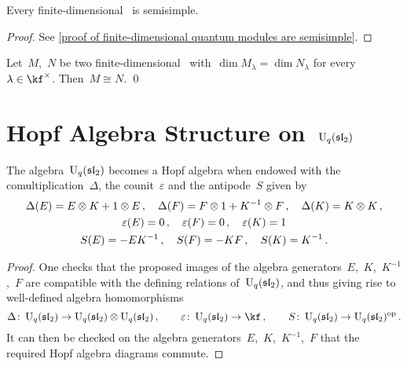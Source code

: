 \documentclass[a4paper, 11pt, oneside]{scrartcl}
\begin{document}
\begin{theorem}
  \label{finite-dimensional quantum modules are semisimple}
  Every finite-dimensional~ is semisimple.
\end{theorem}

\begin{proof}[Proof]
  See \cref{proof of finite-dimensional quantum modules are semisimple}.
\end{proof}
  
\begin{corollary}
  \label{decomposition from quantum weight spaces}
  Let~$M$,~$N$ be two finite-dimensional~ with~$\dim M_\lambda = \dim N_\lambda$ for every~$\lambda \in \kf^\times$.
  Then~$M \cong N$.
  \qed
\end{corollary}





\section{Hopf Algebra Structure on~\texorpdfstring{$\operatorname{U}_q(\mathfrak{sl}_2)$}{Uq(sl2)}}


\begin{proposition}
  \label{hopf algebra structure on quantum sl2}
  The algebra~$\operatorname{U}_q(\mathfrak{sl}_2)$ becomes a Hopf algebra when endowed with the comultiplication~$\Delta$, the counit~$\varepsilon$ and the antipode~$S$ given by
  \begin{gather*}
    \Delta(E) = E \otimes K + 1 \otimes E \,,
    \quad
    \Delta(F) = F \otimes 1 + K^{-1} \otimes F \,,
    \quad
    \Delta(K) = K \otimes K \,,
    \\
    \varepsilon(E) = 0 \,,
    \quad
    \varepsilon(F) = 0 \,,
    \quad
    \varepsilon(K) = 1
    \\
    S(E) = -E K^{-1} \,,
    \quad
    S(F) = -KF \,,
    \quad
    S(K) = K^{-1} \,.
  \end{gather*}
\end{proposition}

\begin{proof}
  One checks that the proposed images of the algebra generators~$E$,~$K$,~$K^{-1}$,~$F$ are compatible with the defining relations of~$\operatorname{U}_q(\mathfrak{sl}_2)$, and thus giving rise to well-defined algebra homomorphisms
  \[
    \Delta \colon \Univ_q(\sllie_2) \to \Univ_q(\sllie_2) \tensor \Univ_q(\sllie_2) \,,
    \qquad
    \varepsilon \colon \Univ_q(\sllie_2) \to \kf \,,
    \qquad
    S \colon \Univ_q(\sllie_2) \to \Univ_q(\sllie_2)^{\op} \,.
  \]
  It can then be checked on the algebra generators~$E$,~$K$,~$K^{-1}$,~$F$ that the required Hopf algebra diagrams commute.
\end{proof}
\end{document}
